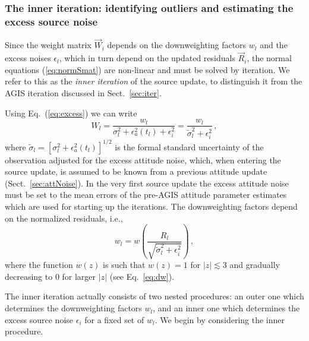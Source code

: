 \documentclass[structabstract]{aa}
\begin{document}
\subsubsection{The inner iteration: identifying outliers and estimating the 
excess source noise}\label{sec:source-inner}

Since the weight matrix $\vec{W}_i$ depends on the downweighting factors $w_l$ 
and the excess noises $\epsilon_l$, which in turn depend on the updated residuals
$\vec{R}_i$, the normal equations (\ref{eq:normSmat}) are non-linear and must be
solved by iteration. We refer to this as the \emph{inner iteration} of the source update, 
to distinguish it from the AGIS iteration discussed in Sect.~\ref{sec:iter}. 

Using Eq.~(\ref{eq:excess}) we can write
\begin{equation} \label{eq:W}
W_l = \frac{w_l}{\sigma_l^2 + \epsilon^2_a(t_l) + \epsilon^2_i} =
\frac{w_l}{\tilde{\sigma}_l^2 + \epsilon^2_i} \, ,
\end{equation}
where $\tilde{\sigma}_l=\left[\sigma_l^2+\epsilon_a^2(t_l)\right]^{1/2}$
is the formal standard uncertainty of the observation adjusted for the excess
attitude noise, which, when entering the source update,  is assumed to 
be known from a previous attitude update (Sect.~\ref{sec:attNoise}). In the very first source update the excess attitude noise must be set
to the mean errors of the pre-AGIS attitude parameter estimates which are
used for starting up the iterations. 
The downweighting factors depend on the normalized residuals, i.e.,
\begin{equation} \label{eq:wl}
w_l = w\left(\frac{R_l}{\sqrt{\tilde{\sigma}_l^2 + \epsilon^2_i}}\right) \, ,
\end{equation}
where the function $w(z)$ is such that $w(z)=1$ for $|z|\lesssim 3$ and 
gradually decreasing to 0 for larger $|z|$ (see Eq.~\ref{eq:dw}). 

The inner iteration actually consists of two nested procedures: an outer 
one which determines the downweighting factors $w_l$, and an inner one 
which determines the excess source noise $\epsilon_i$ for a fixed set of 
$w_l$. We begin by considering the inner procedure.
\end{document}
